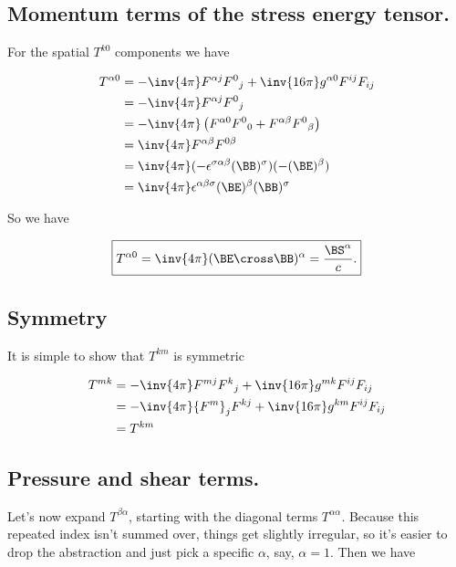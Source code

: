\subsection{Momentum terms of the stress energy tensor.}

For the spatial $T^{k 0}$ components we have

\begin{align*}
T^{\alpha 0} 
&= 
-\inv{4 \pi} F^{\alpha j} {F^0}_j + \inv{16 \pi} g^{\alpha 0} F^{i j} F_{i j} \\
&= 
-\inv{4 \pi} F^{\alpha j} {F^0}_j \\
&= 
-\inv{4 \pi} 
\left( 
F^{\alpha 0} {F^0}_0 
+F^{\alpha \beta} {F^0}_\beta 
\right) \\
&= 
\inv{4 \pi} F^{\alpha \beta} F^{0 \beta} \\
&= 
\inv{4 \pi} (-\epsilon^{\sigma \alpha \beta} (\BB)^\sigma) (-(\BE)^\beta) \\
&= 
\inv{4 \pi} \epsilon^{\alpha \beta \sigma} 
(\BE)^\beta 
(\BB)^\sigma
\\
\end{align*}

So we have

\begin{equation}\label{eqn:relativisticElectrodynamicsPS6:220}
\boxed{
T^{\alpha 0} = \inv{4 \pi} (\BE \cross \BB)^\alpha = \frac{\BS^\alpha}{c}.
}
\end{equation}

\subsection{Symmetry}

It is simple to show that $T^{k m}$ is symmetric

\begin{align*}
T^{m k} 
&= -\inv{4\pi} F^{m j} {F^{k}}_j + \inv{16 \pi} g^{m k} F^{i j} F_{i j} \\
&= -\inv{4\pi} {F^{m}}_j F^{k j} + \inv{16 \pi} g^{k m} F^{i j} F_{i j} \\
&= T^{k m}
\end{align*}

\subsection{Pressure and shear terms.}

Let's now expand $T^{\beta \alpha}$, starting with the diagonal terms $T^{\alpha\alpha}$.  Because this repeated index isn't summed over, things get slightly irregular, so it's easier to drop the abstraction and just pick a specific $\alpha$, say, $\alpha = 1$.  Then we have

